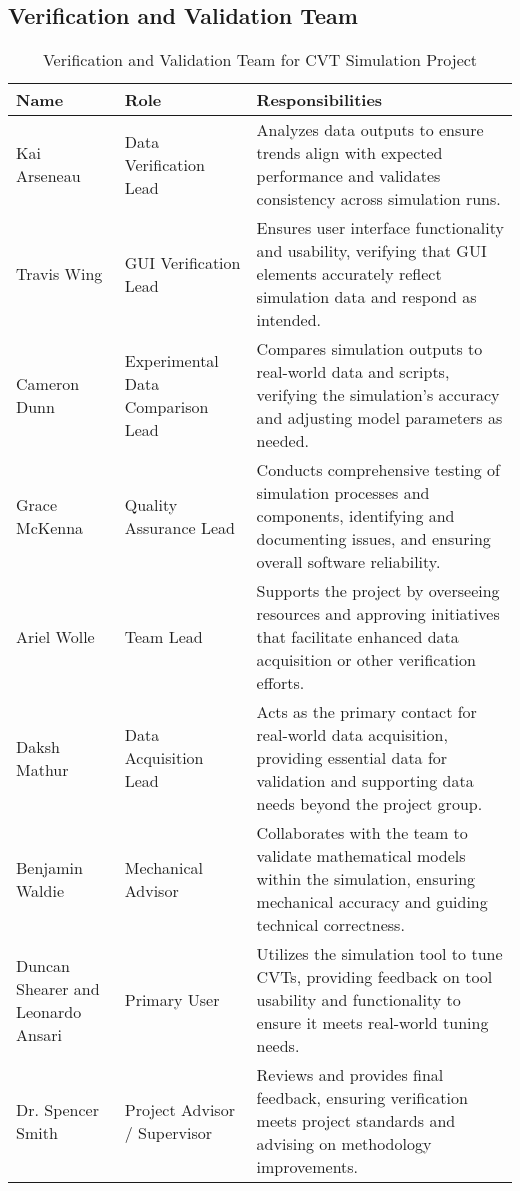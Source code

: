 \documentclass[12pt, titlepage]{article}
\begin{document}
\subsection{Verification and Validation Team}


\begin{table}[h!]
  \centering
  \begin{tabular}{|p{3cm}|p{3cm}|p{10cm}|}
  \hline
  \textbf{Name} & \textbf{Role} & \textbf{Responsibilities} \\
  \hline
  Kai Arseneau & Data Verification Lead & Analyzes data outputs to ensure trends align with expected performance and validates consistency across simulation runs. \\
  \hline
  Travis Wing & GUI Verification Lead & Ensures user interface functionality and usability, verifying that GUI elements accurately reflect simulation data and respond as intended. \\
  \hline
  Cameron Dunn & Experimental Data Comparison Lead & Compares simulation outputs to real-world data and scripts, verifying the simulation's accuracy and adjusting model parameters as needed. \\
  \hline
  Grace McKenna & Quality Assurance Lead & Conducts comprehensive testing of simulation processes and components, identifying and documenting issues, and ensuring overall software reliability. \\
  \hline
  Ariel Wolle & Team Lead & Supports the project by overseeing resources and approving initiatives that facilitate enhanced data acquisition or other verification efforts. \\
  \hline
  Daksh Mathur &  Data Acquisition Lead & Acts as the primary contact for real-world data acquisition, providing essential data for validation and supporting data needs beyond the project group. \\
  \hline
  Benjamin Waldie & Mechanical Advisor & Collaborates with the team to validate mathematical models within the simulation, ensuring mechanical accuracy and guiding technical correctness. \\
  \hline
  Duncan Shearer and Leonardo Ansari & Primary User & Utilizes the simulation tool to tune CVTs, providing feedback on tool usability and functionality to ensure it meets real-world tuning needs. \\
  \hline
  Dr. Spencer Smith & Project Advisor / Supervisor & Reviews and provides final feedback, ensuring verification meets project standards and advising on methodology improvements. \\
  \hline
  \end{tabular}
  \caption{Verification and Validation Team for CVT Simulation Project}
  \label{tab:vnv_team}
\end{table}
\restoregeometry
    
\end{document}
